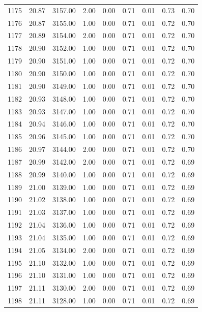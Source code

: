 \documentclass{article}\usepackage[]{graphicx}\usepackage[]{color}
\begin{document}
\begin{longtable}{rrrrrrrrr}
  1175 & 20.87 & 3157.00 & 2.00 & 0.00 & 0.71 & 0.01 & 0.73 & 0.70 \\ 
  1176 & 20.87 & 3155.00 & 1.00 & 0.00 & 0.71 & 0.01 & 0.72 & 0.70 \\ 
  1177 & 20.89 & 3154.00 & 2.00 & 0.00 & 0.71 & 0.01 & 0.72 & 0.70 \\ 
  1178 & 20.90 & 3152.00 & 1.00 & 0.00 & 0.71 & 0.01 & 0.72 & 0.70 \\ 
  1179 & 20.90 & 3151.00 & 1.00 & 0.00 & 0.71 & 0.01 & 0.72 & 0.70 \\ 
  1180 & 20.90 & 3150.00 & 1.00 & 0.00 & 0.71 & 0.01 & 0.72 & 0.70 \\ 
  1181 & 20.90 & 3149.00 & 1.00 & 0.00 & 0.71 & 0.01 & 0.72 & 0.70 \\ 
  1182 & 20.93 & 3148.00 & 1.00 & 0.00 & 0.71 & 0.01 & 0.72 & 0.70 \\ 
  1183 & 20.93 & 3147.00 & 1.00 & 0.00 & 0.71 & 0.01 & 0.72 & 0.70 \\ 
  1184 & 20.94 & 3146.00 & 1.00 & 0.00 & 0.71 & 0.01 & 0.72 & 0.70 \\ 
  1185 & 20.96 & 3145.00 & 1.00 & 0.00 & 0.71 & 0.01 & 0.72 & 0.70 \\ 
  1186 & 20.97 & 3144.00 & 2.00 & 0.00 & 0.71 & 0.01 & 0.72 & 0.70 \\ 
  1187 & 20.99 & 3142.00 & 2.00 & 0.00 & 0.71 & 0.01 & 0.72 & 0.69 \\ 
  1188 & 20.99 & 3140.00 & 1.00 & 0.00 & 0.71 & 0.01 & 0.72 & 0.69 \\ 
  1189 & 21.00 & 3139.00 & 1.00 & 0.00 & 0.71 & 0.01 & 0.72 & 0.69 \\ 
  1190 & 21.02 & 3138.00 & 1.00 & 0.00 & 0.71 & 0.01 & 0.72 & 0.69 \\ 
  1191 & 21.03 & 3137.00 & 1.00 & 0.00 & 0.71 & 0.01 & 0.72 & 0.69 \\ 
  1192 & 21.04 & 3136.00 & 1.00 & 0.00 & 0.71 & 0.01 & 0.72 & 0.69 \\ 
  1193 & 21.04 & 3135.00 & 1.00 & 0.00 & 0.71 & 0.01 & 0.72 & 0.69 \\ 
  1194 & 21.05 & 3134.00 & 2.00 & 0.00 & 0.71 & 0.01 & 0.72 & 0.69 \\ 
  1195 & 21.10 & 3132.00 & 1.00 & 0.00 & 0.71 & 0.01 & 0.72 & 0.69 \\ 
  1196 & 21.10 & 3131.00 & 1.00 & 0.00 & 0.71 & 0.01 & 0.72 & 0.69 \\ 
  1197 & 21.11 & 3130.00 & 2.00 & 0.00 & 0.71 & 0.01 & 0.72 & 0.69 \\ 
  1198 & 21.11 & 3128.00 & 1.00 & 0.00 & 0.71 & 0.01 & 0.72 & 0.69 \\ 

\end{longtable}
\end{document}
